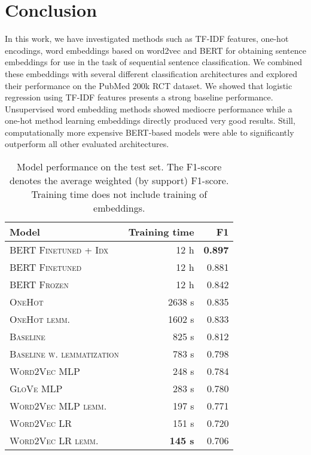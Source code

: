 \section{Conclusion}
\label{sec:conclusion}

In this work, we have investigated methods such as TF-IDF features, one-hot encodings, word embeddings based on word2vec and BERT for obtaining sentence embeddings for use in the task of sequential sentence classification. We combined these embeddings with several different classification architectures and explored their performance on the PubMed 200k RCT dataset. We showed that logistic regression using TF-IDF features presents a strong baseline performance. Unsupervised word embedding methods showed mediocre performance while a one-hot method learning embeddings directly produced very good results. Still, computationally more expensive BERT-based models were able to significantly outperform all other evaluated architectures.



\begin{table}[]
\centering
{}
\begin{tabular}{@{}
  l
  r %
  r %
  @{}}
\toprule
Model & {Training time} & {F1} \\
\midrule
\textsc{BERT Finetuned + Idx} & 12 h & \bfseries 0.897 \\
\textsc{BERT Finetuned} & 12 h & 0.881 \\
\textsc{BERT Frozen} & 12 h & 0.842 \\
\textsc{OneHot} & 2638 s & 0.835 \\
\textsc{OneHot lemm.} & 1602 s & 0.833 \\
\textsc{Baseline} & 825 s & 0.812\\
\textsc{Baseline w. lemmatization} & 783 s & 0.798 \\
\textsc{Word2Vec MLP} & 248 s & 0.784 \\
\textsc{GloVe MLP} & 283 s & 0.780 \\
\textsc{Word2Vec MLP lemm.} & 197 s & 0.771 \\
\textsc{Word2Vec LR} & 151 s & 0.720 \\
\textsc{Word2Vec LR lemm.} & \bfseries 145 s & 0.706 \\
\bottomrule
\end{tabular}
\caption{Model performance on the test set. The F1-score denotes the average weighted (by support) F1-score. Training time does not include training of embeddings.}
\label{tab:results}
\end{table}

